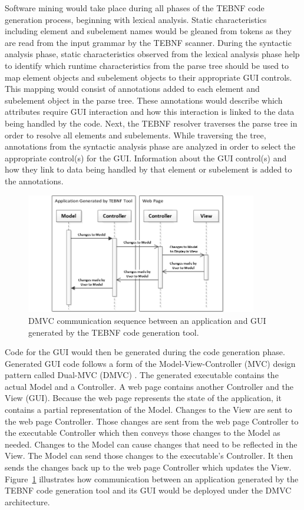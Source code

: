 \indent
Software mining would take place during all phases of the TEBNF code generation process, beginning with lexical analysis.  Static characteristics including element and subelement names would be gleaned from tokens as they are read from the input grammar by the TEBNF scanner.  During the syntactic analysis phase, static characteristics observed from the lexical analysis phase help to identify which runtime characteristics from the parse tree should be used to map element objects and subelement objects to their appropriate GUI controls.  This mapping would consist of annotations added to each element and subelement object in the parse tree.  These annotations would describe which attributes require GUI interaction and how this interaction is linked to the data being handled by the code.
Next, the TEBNF resolver traverses the parse tree in order to resolve all elements and subelements.  While traversing the tree, annotations from the syntactic analysis phase are analyzed in order to select the appropriate control(s) for the GUI.  Information about the GUI control(s) and how they link to data being handled by that element or subelement is added to the annotations.

\begin{figure}[h!]
\centering
\includegraphics[width=0.9\textwidth]{figures/DmvcCommSequence.png}
\caption{DMVC communication sequence between an application and GUI generated by the TEBNF code generation tool.}
\label{fig:DmvcCommSequence}
\end{figure}

\indent
Code for the GUI would then be generated during the code generation phase.  Generated GUI code follows a form of the Model-View-Controller (MVC) design pattern called Dual-MVC (DMVC) \cite{leff_01}.  The generated executable contains the actual Model and a Controller.  A web page contains another Controller and the View (GUI).  Because the web page represents the state of the application, it contains a partial representation of the Model.  Changes to the View are sent to the web page Controller.  Those changes are sent from the web page Controller to the executable Controller which then conveys those changes to the Model as needed.  Changes to the Model can cause changes that need to be reflected in the View.  The Model can send those changes to the executable’s Controller.  It then sends the changes back up to the web page Controller which updates the View.  Figure~\ref{fig:DmvcCommSequence} illustrates how communication between an application generated by the TEBNF code generation tool and its GUI would be deployed under the DMVC architecture.

